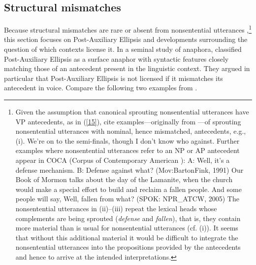 \subsection{Structural mismatches}
\label{sec-structural-mismatches}

\largerpage[.8]
Because structural mismatches are rare or absent from nonsentential utterances \citep[see][]{Merchant2005a, Merchant2013},\footnote{Given the assumption that canonical sprouting nonsentential utterances have VP antecedents, as in (\ref{15}), \citet[95]{Ginzburg2018} cite examples---originally from \citet[13]{Beecher2008}---of sprouting nonsentential utterances with nominal, hence mismatched, antecedents, e.g., (i).
\ea 
We're on to the semi-finals, though I don't know who against.
\z
%
Further examples where nonsentential utterances refer to an NP or AP antecedent appear in COCA (Corpus of Contemporary American ):
%
\ea
A: Well, it's a defense mechanism. B: Defense against what? (Mov:BartonFink, 1991)
\z\vspace{-\baselineskip}
\eanoraggedright
Our Book of Mormon talks about the day of the Lamanite, when the church would make a special effort
to build and reclaim a fallen people. And some people will say, Well, fallen from what? (SPOK:
NPR\_ATCW, 2005)
\z\vspace{-2pt}
%
The nonsentential utterances in (ii)--(iii) repeat the lexical heads whose complements are being sprouted (\textit{defense} and \textit{fallen}), that is, they contain more material than is usual for nonsentential utterances (cf. (i)). It seems that without this additional material it would be difficult to integrate the nonsentential utterances into the propositions provided by the antecedents and hence to arrive at the intended interpretations.} this section focuses on Post-Auxiliary Ellipsis and developments surrounding the question of which contexts license it. In a seminal study of anaphora, \citet{Hankamer1976} classified Post-Auxiliary Ellipsis as a surface anaphor with syntactic features closely matching those of an antecedent present in the linguistic context. They argued in particular that Post-Auxiliary Ellipsis is not licensed if it mismatches its antecedent in voice. Compare the following two examples from \citet[327]{Hankamer1976}.

